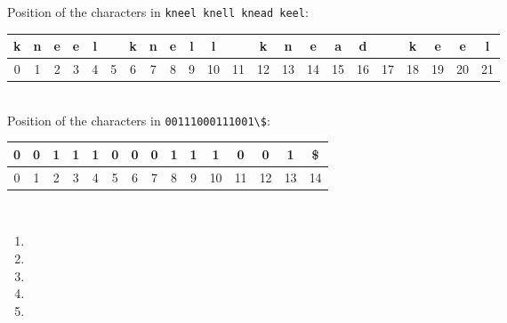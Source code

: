 \documentclass[12pt]{article}
\begin{document}
Position of the characters in \verb+kneel knell knead keel+:\\
\begin{tabular}{|c|c|c|c|c|c|c|c|c|c|c|c|c|c|c|c|c|c|c|c|c|c|}
\hline
k & n & e & e & l & & k & n & e & l & l & & k & n & e & a & d & & k & e & e & l\\\hline
0 & 1 & 2 & 3 & 4 & 5 & 6 & 7 & 8 & 9 & 10 & 11 & 12 & 13 & 14 & 15 & 16 & 17 & 18 & 19 & 20 & 21\\\hline
\end{tabular}\\

Position of the characters in \verb+00111000111001\$+:\\
\begin{tabular}{|c|c|c|c|c|c|c|c|c|c|c|c|c|c|c|}
\hline
0 & 0 & 1 & 1 & 1 & 0 & 0 & 0 & 1 & 1 & 1 & 0 & 0 & 1 & \$\\\hline
0 & 1 & 2 & 3 & 4 & 5 & 6 & 7 & 8 & 9 & 10 & 11 & 12 & 13 & 14\\\hline
\end{tabular}\\

\begin{enumerate}
\item  \done
\item  \done
\item  \done
\item  \done
\item  \done
\end{enumerate}
\end{document}
